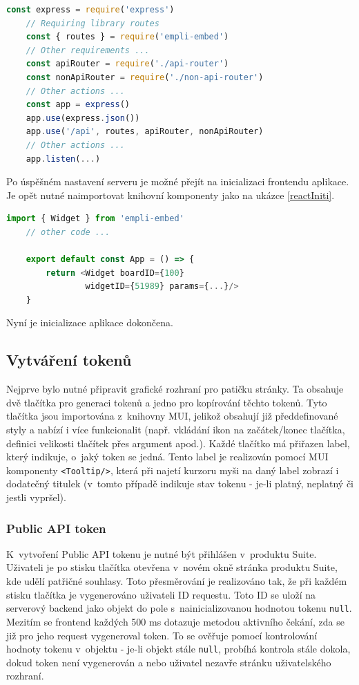 \documentclass[czech, bc, kiv, he, iso690numb]{fasthesis}
\begin{document}
\begin{lstlisting}[language=Javascript, caption={Inicializace Express serveru}, label=expressInit]
	const express = require('express')
	// Requiring library routes
	const { routes } = require('empli-embed') 
	// Other requirements ...
	const apiRouter = require('./api-router')
	const nonApiRouter = require('./non-api-router')
	// Other actions ...
	const app = express()
	app.use(express.json())
	app.use('/api', routes, apiRouter, nonApiRouter)
	// Other actions ...
	app.listen(...)
\end{lstlisting}

Po úspěšném nastavení serveru je možné přejít na inicializaci frontendu aplikace. Je opět nutné naimportovat knihovní komponenty jako na ukázce \ref{reactIniti}.
\begin{lstlisting}[language=Javascript, caption={Inicializace React komponenty}, label=reactIniti]
	import { Widget } from 'empli-embed'
	// other code ...

	export default const App = () => {
		return <Widget boardID={100} 
				widgetID={51989} params={...}/>
	}
\end{lstlisting}

Nyní je inicializace aplikace dokončena. 

\subsection{Vytváření tokenů}

Nejprve bylo nutné připravit grafické rozhraní pro patičku stránky. Ta obsahuje dvě tlačítka pro generaci tokenů a jedno pro kopírování těchto tokenů. Tyto tlačítka
jsou importována z~knihovny MUI, jelikož obsahují již předdefinované styly a nabízí i více funkcionalit (např. vkládání ikon na začátek/konec tlačítka, definici velikosti
tlačítek přes argument apod.). Každé tlačítko má přiřazen label, který indikuje, o~jaký token se jedná. Tento label je realizován pomocí MUI komponenty
\texttt{<Tooltip/>}, která při najetí kurzoru myši na daný label zobrazí i dodatečný titulek (v~tomto případě indikuje stav tokenu - je-li platný, neplatný či jestli vypršel).


\subsubsection{Public API token}
K~vytvoření Public API tokenu je nutné být přihlášen v~produktu Suite. Uživateli je po stisku tlačítka otevřena v~novém okně stránka produktu Suite, kde udělí patřičné souhlasy. 
Toto přesměrování je realizováno tak, že při každém stisku tlačítka je vygenerováno uživateli ID requestu. Toto ID se uloží na serverový backend jako objekt do pole s~nainicializovanou
hodnotou tokenu \texttt{null}. Mezitím se frontend každých 500 ms dotazuje metodou aktivního čekání, zda se již pro jeho request vygeneroval token. To se ověřuje pomocí kontrolování hodnoty
tokenu v~objektu - je-li objekt stále \texttt{null}, probíhá kontrola stále dokola, dokud token není vygenerován a nebo uživatel nezavře stránku uživatelského rozhraní.
\end{document}
